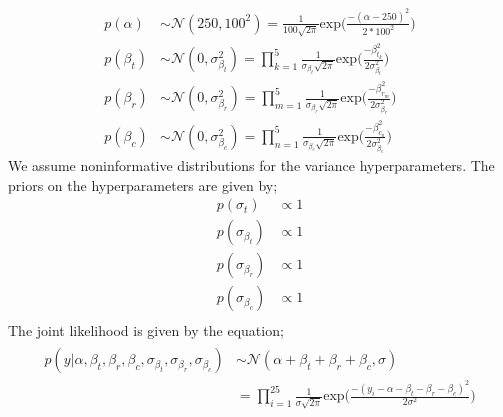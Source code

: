\documentclass{article}
\begin{document}
\begin{align}
p(\alpha) &\sim \mathcal{N}(250,100^2)
= \frac{1}{100\sqrt{2 \pi}}  \text{exp}\Big(\frac{- (\alpha - 250)^2}{2*100^2}\Big)\\
p(\beta_{t}) &\sim \mathcal{N}(0, \sigma^2_{\beta_{t}}) = \prod_{k = 1}^{5}\frac{1}{\sigma_{\beta_t}\sqrt{2\pi}} \text{exp}\Big(\frac{- \beta^2_{t_{k}}}{2\sigma^2_{\beta_t}}\Big)\\
p(\beta_r) &\sim \mathcal{N}(0, \sigma^2_{\beta_r})= \prod_{m = 1}^{5}\frac{1}{\sigma_{\beta_r}\sqrt{2\pi}} \text{exp}\Big(\frac{- \beta^2_{r_{m}}}{2\sigma^2_{\beta_r}}\Big)\\
p(\beta_c) &\sim \mathcal{N}(0, \sigma^2_{\beta_c})= \prod_{n = 1}^{5}\frac{1}{\sigma_{\beta_c}\sqrt{2\pi}} \text{exp}\Big(\frac{- \beta^2_{c_{n}}}{2\sigma^2_{\beta_c}}\Big)\end{align}
We assume noninformative distributions for the variance hyperparameters. The priors on the hyperparameters are given by;
\begin{align*}
p(\sigma_t) &\propto 1\\
p(\sigma_{\beta_{t}}) &\propto 1\\
p(\sigma_{\beta_{r}}) &\propto 1\\
p(\sigma_{\beta_{c}}) &\propto 1\\
\end{align*}
The joint likelihood is given by the equation;
\begin{align}
\begin{split}
p(y | \alpha, \beta_t, \beta_r, \beta_c, \sigma_{\beta_{t}},\sigma_{\beta_{r}},\sigma_{\beta_{c}} ) &\sim \mathcal{N}(\alpha + \beta_t + \beta_r + \beta_c, \sigma)\\
&= \prod_{i = 1}^{25} \frac{1}{\sigma \sqrt{2 \pi}} \text{exp}\Big(\frac{-(y_i -\alpha - \beta_t - \beta_r - \beta_c)^2}{2\sigma^2}\Big)
\end{split}
\end{align}
\end{document}
